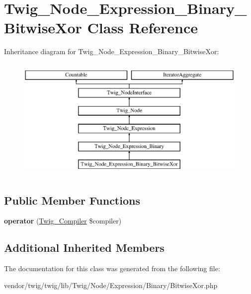 \hypertarget{classTwig__Node__Expression__Binary__BitwiseXor}{}\section{Twig\+\_\+\+Node\+\_\+\+Expression\+\_\+\+Binary\+\_\+\+Bitwise\+Xor Class Reference}
\label{classTwig__Node__Expression__Binary__BitwiseXor}
Inheritance diagram for Twig\+\_\+\+Node\+\_\+\+Expression\+\_\+\+Binary\+\_\+\+Bitwise\+Xor\+:\begin{figure}[H]
\begin{center}
\leavevmode
\includegraphics[height=6.000000cm]{classTwig__Node__Expression__Binary__BitwiseXor}
\end{center}
\end{figure}
\subsection*{Public Member Functions}
\begin{DoxyCompactItemize}
\item 
{\bfseries operator} (\hyperlink{classTwig__Compiler}{Twig\+\_\+\+Compiler} \$compiler)\hypertarget{classTwig__Node__Expression__Binary__BitwiseXor_aa004075ea2707c6a292cb6316b301d4f}{}\label{classTwig__Node__Expression__Binary__BitwiseXor_aa004075ea2707c6a292cb6316b301d4f}

\end{DoxyCompactItemize}
\subsection*{Additional Inherited Members}


The documentation for this class was generated from the following file\+:\begin{DoxyCompactItemize}
\item 
vendor/twig/twig/lib/\+Twig/\+Node/\+Expression/\+Binary/Bitwise\+Xor.\+php\end{DoxyCompactItemize}

